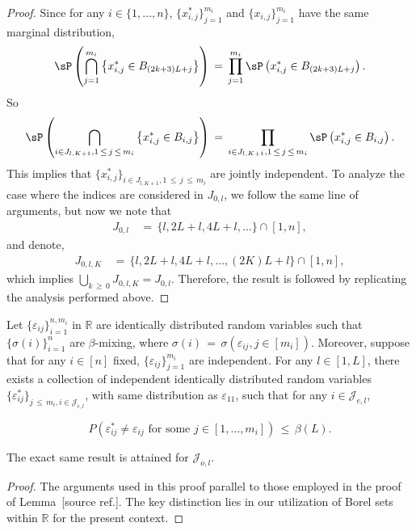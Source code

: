 \documentclass[twoside,11pt]{article}
\makeatletter
\newcommand{\discardlabel}[1]{}
\newcommand{\discardtwo}[2]{}
\newcommand{\legacyref}[1]{\textup{[source ref.]}}
\newcommand{\legacyeqref}[1]{\textup{[source equation]}}
\newenvironment{legacycomparison}{%
  \begingroup\color{legacygray}%
  \let\label\discardlabel
  \let\originallabel\discardlabel
  \let\ref\legacyref
  \let\pageref\legacyref
  \let\eqref\legacyeqref
  \let\cref\legacyref
  \let\Cref\legacyref
  \let\autoref\legacyref
  \let\aliasref\discardtwo
}{\endgroup}
\newcommand{\aliasref}[2]{%
  \@ifundefined{r@#2}{}{%
    \expandafter\let\csname r@#1\expandafter\endcsname\csname r@#2\endcsname}}
\makeatother
\begin{document}
\begin{legacycomparison}
\begin{proof}
Since for any \( i \in \{1, \ldots, n\} \), \(\{x_{i,j}^*\}_{j=1}^{m_i}\) and \(\{x_{i,j}\}_{j=1}^{m_i}\) have the same marginal distribution,
\begin{align}
    \sP\left(\bigcap_{j=1}^{m_i} \left\{x_{i,j}^* \in B_{(2k+3)L+j}\right\}\right) \,=\, \prod_{j=1}^{m_i} \sP\left(x_{i,j}^* \in B_{(2k+3)L+j}\right).
\end{align}
So
\begin{align}
    \sP\left(\bigcap_{i \in J_{l,K+1}, 1 \,\leq\, j \,\leq\, m_i} \left\{x_{i,j}^* \in B_{i,j}\right\}\right) \,=\, \prod_{i \in J_{l,K+1}, 1 \,\leq\, j \,\leq\, m_i} \sP\left(x_{i,j}^* \in B_{i,j}\right).
\end{align}
This implies that \(\{x_{i,j}^*\}_{i\in J_{l,K+1},1\,\leq\, j\,\leq\, m_i}\) are jointly independent. To analyze the case where the indices are considered in \(J_{0,l}\), we follow the same line of arguments, but now we note that
\begin{align}
    J_{0,l} &\,=\, \{l,2L + l, 4L + l, \ldots \} \cap [1,n],
\end{align}
and denote,
\begin{align}
    J_{0,l,K} &\,=\, \{l, 2L + l, 4L + l, \ldots, (2K)L + l\} \cap [1,n],
\end{align}
which implies \(\bigcup_{k \,\geq\, 0} J_{0,l,K} = J_{0,l}\). Therefore, the result is followed by replicating the analysis performed above. 
\end{proof}

\begin{lemma}
\label{Lemma 10.} Let \(\{\varepsilon_{ij}\}^{n,m_i}_{i=1}\) in \(\mathbb{R}\) are identically distributed random variables such that \(\{\sigma(i)\}^{n}_{i=1}\) are \(\beta\)-mixing, where \(\sigma(i) \,=\, \sigma(\varepsilon_{ij}, j \in [m_i])\). Moreover, suppose that for any \(i \in [n]\) fixed, \(\{\varepsilon_{ij}\}^{m_i}_{j=1}\) are independent. For any \(l \in [1, L]\), there exists a collection of independent identically distributed random variables \(\{\varepsilon_{ij}^*\}_{j \,\leq\, m_i, i \in \mathcal{J}_{e,l}}\), with same distribution as \(\varepsilon_{11}\), such that for any \(i \in \mathcal{J}_{e,l}\),

\[
P(\varepsilon_{ij}^* \neq \varepsilon_{ij} \text{ for some } j \in [1, \ldots, m_i]) \,\leq\, \beta(L).
\]

The exact same result is attained for \(\mathcal{J}_{o,l}\).
\end{lemma}

\begin{proof} The arguments used in this proof parallel to those employed in the proof of Lemma~\ref{Lemma_9}. The key distinction lies in our utilization of Borel sets within \(\mathbb{R}\) for the present context. 
\end{proof}


\end{legacycomparison}
\end{document}
